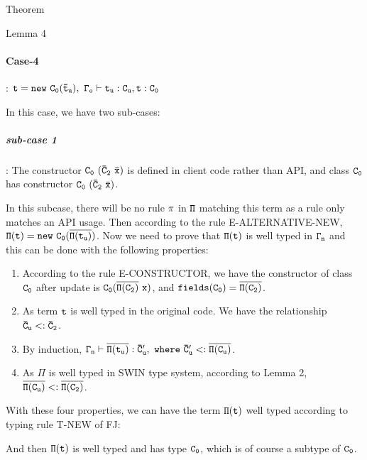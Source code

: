 \documentclass[GBK,winfonts,a4paper,11pt]{article}
\begin{document}
\begin{section}{Theorem}
\begin{subsection}{Lemma 4}
\paragraph{Case-4}:
$\tt t=new\ C_0(\bar{t}_u),\ \Gamma_o\vdash t_u:C_u, t:C_0$
\par
In this case, we have two sub-cases:
\subparagraph{sub-case 1}: The constructor $\tt C_0\ (\bar{C}_2\ \bar{x})$ is defined in client code rather than API, and class $\tt C_0$ has constructor $\tt  C_0\ (\bar{C}_2\ \bar{x})$.
\par In this subcase, there will be no rule $\tt\pi$ in $\tt \Pi$ matching this term as a rule only matches an API usage. Then according to the rule E-ALTERNATIVE-NEW, 
$\tt\Pi(t)=new\ C_0(\overline{\Pi(t_u)})$. Now we need to prove that $\tt\Pi(t)$ is well typed in $\tt \Gamma_n$ and this can be done with the following properties:
\begin{enumerate}
\item According to the rule E-CONSTRUCTOR, we have the constructor of class $\tt C_0$ after update is $\tt C_0(\overline{\Pi(C_2)}\ x)$, and $\tt fields(C_0) = \overline{\Pi(C_2)}$.
\item As term $\tt t$ is well typed in the original code. We have the relationship $\tt \bar{C}_u <: \bar{C}_2$.
\item By induction, $\tt \Gamma_n \vdash \overline{\Pi(t_u)}: \bar{C}'_u,\ where\ \bar{C}'_u <: \overline{\Pi(C_u)}$.
\item As $\Pi$ is well typed in SWIN type system, according to Lemma 2, $\tt \overline{\Pi(C_u)} <: \overline{\Pi(C_2)}$.
\end{enumerate}
With these four properties, we can have the term $\tt\Pi(t)$ well typed according to typing rule T-NEW of FJ:
\begin{center}
\DP
\end{center}
And then $\tt\Pi(t)$ is well typed and has type $\tt C_0$, which is of course a subtype of $\tt C_0$.


\end{subsection}
\end{section}
\end{document}
